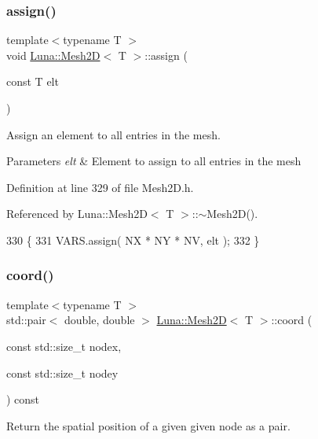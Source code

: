 \subsubsection{\texorpdfstring{assign()}{assign()}}
{\footnotesize\ttfamily template$<$typename T $>$ \\
void \hyperlink{classLuna_1_1Mesh2D}{Luna\+::\+Mesh2D}$<$ T $>$\+::assign (\begin{DoxyParamCaption}\item[{const T}]{elt }\end{DoxyParamCaption})}



Assign an element to all entries in the mesh. 


\begin{DoxyParams}{Parameters}
{\em elt} & Element to assign to all entries in the mesh \\
\hline
\end{DoxyParams}


Definition at line 329 of file Mesh2\+D.\+h.



Referenced by Luna\+::\+Mesh2\+D$<$ T $>$\+::$\sim$\+Mesh2\+D().


\begin{DoxyCode}
330   \{
331     VARS.assign( NX * NY * NV, elt );
332   \}
\end{DoxyCode}
\mbox{\label{classLuna_1_1Mesh2D_add4d12155922731ccf59fe4454699eed}} 
\subsubsection{\texorpdfstring{coord()}{coord()}}
{\footnotesize\ttfamily template$<$typename T $>$ \\
std\+::pair$<$ double, double $>$ \hyperlink{classLuna_1_1Mesh2D}{Luna\+::\+Mesh2D}$<$ T $>$\+::coord (\begin{DoxyParamCaption}\item[{const std\+::size\+\_\+t}]{nodex,  }\item[{const std\+::size\+\_\+t}]{nodey }\end{DoxyParamCaption}) const\hspace{0.3cm}{\ttfamily [inline]}}



Return the spatial position of a given given node as a pair. 


